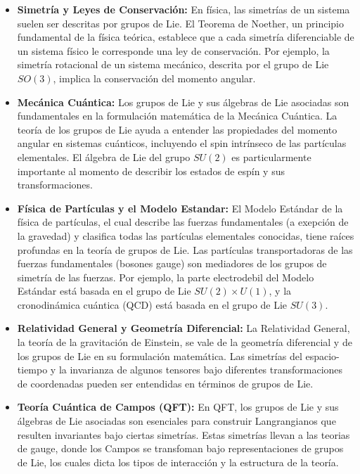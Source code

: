 \documentclass{article}
\begin{document}
\begin{itemize}
  \item \textbf{Simetría y Leyes de Conservación:} En física, las simetrías de un sistema suelen ser descritas por grupos de Lie. El Teorema de Noether, un principio fundamental de la física teórica, establece que a cada simetría diferenciable de un sistema físico le corresponde una ley de conservación. Por ejemplo, la simetría rotacional de un sistema mecánico, descrita por el grupo de Lie $SO(3)$, implica la conservación del momento angular.
  
  \item \textbf{Mecánica Cuántica:} Los grupos de Lie y sus álgebras de Lie asociadas son fundamentales en la formulación matemática de la Mecánica Cuántica. La teoría de los grupos de Lie ayuda a entender las propiedades del momento angular en sistemas cuánticos, incluyendo el spin intrínseco de las partículas elementales. El álgebra de Lie del grupo $SU(2)$ es particularmente importante al momento de describir los estados de espín y sus transformaciones.
  
  \item \textbf{Física de Partículas y el Modelo Estandar:} El Modelo Estándar de la física de partículas, el cual describe las fuerzas fundamentales (a exepción de la gravedad) y clasifica todas las partículas elementales conocidas, tiene raíces profundas en la teoría de grupos de Lie. Las partículas transportadoras de las fuerzas fundamentales (bosones gauge) son mediadores de los grupos de simetría de las fuerzas. Por ejemplo, la parte electrodebil del Modelo Estándar está basada en el grupo de Lie $SU(2) \times U(1)$, y la cronodinámica cuántica (QCD) está basada en el grupo de Lie $SU(3)$.  %

  \item \textbf{Relatividad General y Geometría Diferencial:} La Relatividad General, la teoría de la gravitación de Einstein, se vale de la geometría diferencial y de los grupos de Lie en su formulación matemática. Las simetrías del espacio-tiempo y la invarianza de algunos tensores bajo diferentes transformaciones de coordenadas pueden ser entendidas en términos de grupos de Lie.

  \item \textbf{Teoría Cuántica de Campos (QFT):} En QFT, los grupos de Lie y sus álgebras de Lie asociadas son esenciales para construir Langrangianos que resulten invariantes bajo ciertas simetrías. Estas simetrías llevan a las teorias de gauge, donde los Campos se transfoman bajo representaciones de grupos de Lie, los cuales dicta los tipos de interacción y la estructura de la teoría.
\end{itemize}
\end{document}
